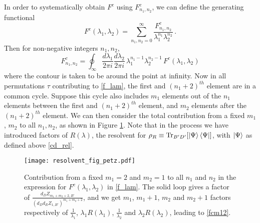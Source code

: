 \documentclass[a4paper,11pt]{article}
\newcommand{\be}{\begin{equation}}
\newcommand{\ee}{\end{equation}}
\begin{document}
\begin{enumerate}
\begin{appendix}
In order to systematically obtain $F^c$ using $F^c_{n_1, n_2}$, we can define the generating functional
\be 
F^{c}(\lambda_1, \lambda_2) = \sum_{n_1, n_2=0}^{\infty} \frac{F^{c}_{n_1, n_2}}{\lambda_1^{n_1} \lambda_2^{n_2}} \, . \label{f_lam}
\ee
Then for non-negative integers $n_1, n_2$, 
\be 
F^{c}_{n_1, n_2} = \oint_{\infty} \frac{d\lambda_1}{2\pi i}\frac{d\lambda_2}{2\pi i} \, \lambda_1^{n_1-1} \lambda_2^{n_2-1} \, F^{c}(\lambda_1, \lambda_2) \label{fc_n1_n2}
\ee
where the contour is taken to be around the point at infinity. 
Now in all permutations $\tau$ contributing to \eqref{f_lam}, the first and $(n_1+2)^{th}$
 element are in a common cycle. Suppose this cycle also includes $m_1$ elements out of the $n_1$ elements between the first and $(n_1 + 2)^{th}$ element, and $m_2$ elements after the $(n_1 + 2)^{th}$ element. We can then consider the total contribution from a fixed $m_1$, $m_2$ to all $n_1, n_2$, as shown in Figure \ref{fig:petz_sum}. Note that in the process we have introduced factors of 
$R(\lambda)$, the resolvent for $\rho_R \equiv \text{Tr}_{B'D'}[\ket{\Psi} \bra{\Psi}]$, with $\ket{\Psi}$ as defined above \eqref{cd_rel}. 
\begin{figure}[!h]
\centering 
\texttt{[image: resolvent\_fig\_petz.pdf]}
\caption{Contribution from a fixed $m_1 = 2$ and $m_2=1$ to all $n_1$ and $n_2$ in the expression for $F^{c}(\lambda_1, \lambda_2) $ in \eqref{f_lam}. The solid loop gives a factor of $\frac{d_DZ_{m_1 + m_2 + 2, B'}}{(d_D d_R Z_{1, B'} )^{m_1+m_2+2} }$, and we get $m_1$, $m_1+1$, $m_2$ and $m_2+1$ factors respectively of $\frac{1}{\lambda_1}$, $\lambda_1 R(\lambda_1)$, $\frac{1}{\lambda_2}$ and $\lambda_2 R(\lambda_2)$, leading to \eqref{fcm12}.}
\label{fig:petz_sum}
\end{figure} 


\end{appendix}
\end{enumerate}
\end{document}
